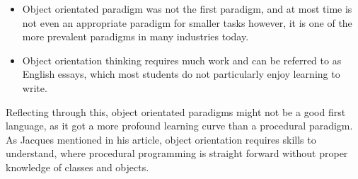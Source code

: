 \begin{itemize}
 \item Object orientated paradigm was not the first paradigm, and at most time is not even an appropriate paradigm for smaller tasks however, it is one of the more prevalent paradigms in many industries today.
 \item Object orientation thinking requires much work and can be referred to as English essays, which most students do not particularly enjoy learning to write.\cite{tutlisp}\cite{medlisp}
\end{itemize}
Reflecting through this, object orientated paradigms might not be a good first language, as it got a more profound learning curve than a procedural paradigm. As Jacques mentioned in his article, object orientation requires skills to understand, where procedural programming is straight forward without proper knowledge of classes and objects.\\
\\